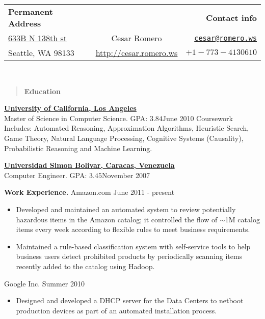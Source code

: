 \documentclass[10pt]{article}
\newcommand{\vitem}{\vspace*{-.4pc}\item}
\begin{document}
\begin{tabular}{lcr}
  \textbf{Permanent Address}&&\textbf{Contact info}\\
  \href{https://maps.google.com/maps?q=2134+Waverly+Pl+N,+Seattle,+WA&hl=en&sll=47.613028,-122.342064&sspn=0.28838,0.547256&oq=2134&hnear=2134+Waverly+Pl+N,+Seattle,+King,+Washington+98109&t=m&z=16}{633B
    N 138th st}&\hspace*{2cm}\huge{Cesar Romero}\hspace*{2cm}&\href{mailto:cesar@romero.ws}{\texttt{cesar@romero.ws}}\\
Seattle, WA
98133&\href{http://cesar.romero.ws}{http://cesar.romero.ws}&$+1-773-4130610$\\
\end{tabular}\\
\underline{\makebox[\textwidth]{\hfill}}
\begin{quote}
  \centering{}
 \textbf{Education}
\end{quote}
\href{http://www.ucla.edu}{\textbf{University of California, Los Angeles}}\\
Master of Science in Computer Science. GPA: $3.84$\hfill June 2010
Coursework Includes: Automated Reasoning, Approximation Algorithms,
Heuristic Search, Game Theory, Natural Language Processing, Cognitive
Systems (Causality), Probabilistic Reasoning and Machine Learning.

\noindent\href{http://www.usb.ve}{\textbf{Universidad Simon Bolivar, Caracas, Venezuela}}\\
Computer Engineer. GPA: $3.45$\hfill November 2007

\centering{}\textbf{Work Experience.}
 Amazon.com \hfill June 2011 - present
\begin{itemize}
  \vitem Developed and maintained an automated system to review
  potentially hazardous items in the Amazon catalog; it controlled the
  flow of $\sim$1M catalog items every week according to flexible rules to
  meet business requirements.
  \vitem Maintained a rule-based classification system with
  self-service tools to help business users detect prohibited products
  by periodically scanning items recently added to the catalog using Hadoop.
\end{itemize}

 Google Inc. \hfill Summer 2010
\begin{itemize}
  \vitem Designed and developed a DHCP server for the Data Centers to
  netboot production devices as part of an automated installation
  process.
\end{itemize}
\end{document}
